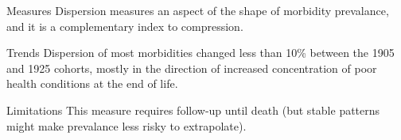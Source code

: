 \documentclass[20pt]{beamer}
\begin{document}
\begin{frame}
\Large
\begin{block}{\Large Measures}
Dispersion measures an aspect of the shape of morbidity prevalance, and it is a
complementary index to compression. 
\end{block}
\pause
\begin{block}{\Large Trends}
Dispersion of most morbidities changed less than 10\% between the 1905 and 1925
cohorts, mostly in the direction of increased concentration of poor health
conditions at the end of life.
\end{block}
\pause
\begin{block}{\Large Limitations}
This measure requires follow-up until death (but stable patterns might make
prevalance less risky to extrapolate). 
\end{block}
\end{frame}

\end{document}
